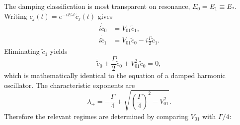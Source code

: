 \documentclass[aps,prx,reprint,showpacs,showkeys,floatfix]{revtex4-2}
\begin{document}
The damping classification is most transparent on resonance,
$E_0=E_1\equiv E_\ast$.  Writing
$c_j(t)=e^{-iE_\ast t}\tilde{c}_j(t)$ gives
\begin{align}
    i\dot{\tilde{c}}_0 &= V_{01}\tilde{c}_1, \\
    i\dot{\tilde{c}}_1 &= V_{01}\tilde{c}_0 - i\frac{\Gamma}{2}\tilde{c}_1.
    \label{eq:modelB_resonant_amp}
\end{align}
Eliminating $\tilde{c}_1$ yields
\begin{equation}
    \ddot{\tilde{c}}_0 + \frac{\Gamma}{2}\dot{\tilde{c}}_0
    + V_{01}^2 \tilde{c}_0 = 0,
    \label{eq:damped_c0}
\end{equation}
which is mathematically identical to the equation of a damped harmonic
oscillator.  The characteristic exponents are
\begin{equation}
    \lambda_{\pm} =
    -\frac{\Gamma}{4}
    \pm
    \sqrt{\left(\frac{\Gamma}{4}\right)^2 - V_{01}^2}.
    \label{eq:lambdaB}
\end{equation}
Therefore the relevant regimes are determined by comparing $V_{01}$ with
$\Gamma/4$:
\end{document}
